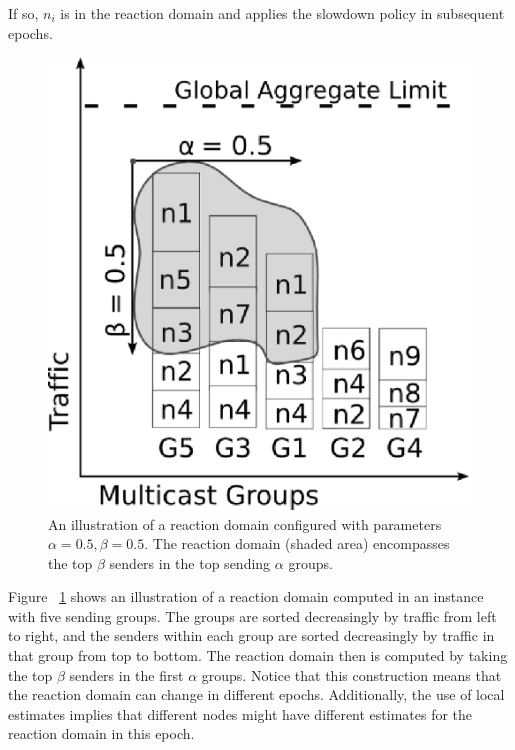 If so, $n_i$ is in the reaction domain and applies the slowdown policy in subsequent epochs.

\begin{figure}[t]
 \centering
 \includegraphics[scale=0.4]{figures/reaction-domain-bubble-gray.eps}
 \caption{An illustration of a reaction domain configured with parameters $\alpha=0.5, \beta=0.5$. The reaction domain (shaded area) encompasses the top $\beta$ senders in the top sending $\alpha$ groups.}
 \label{ill:reaction-domain}
\end{figure}

Figure ~\ref{ill:reaction-domain} shows an illustration of a reaction domain computed in an instance with five sending groups. The groups are sorted decreasingly by traffic from left to right, and the senders within each group are sorted decreasingly by traffic in that group from top to bottom. The reaction domain then is computed by taking the top $\beta$ senders in the first $\alpha$ groups. Notice that this construction means that the reaction domain can change in different epochs. Additionally, the use of local estimates implies that different nodes might have different estimates for the reaction domain in this epoch. 
